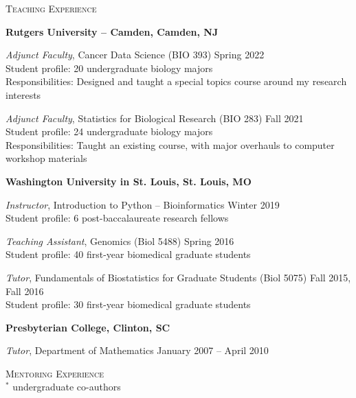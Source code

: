 \documentclass[11pt]{article}
\begin{document}
\hrulefill

\bigskip

\textsc{{\Large Teaching Experience}}

\bigskip

\textbf{Rutgers University -- Camden, Camden, NJ}

\bigskip

\emph{Adjunct Faculty}, Cancer Data Science (BIO 393) \hfill Spring 2022 \\
Student profile: 20 undergraduate biology majors \\
Responsibilities: Designed and taught a special topics course around my research interests

\bigskip

\emph{Adjunct Faculty}, Statistics for Biological Research (BIO 283) \hfill Fall 2021 \\
Student profile: 24 undergraduate biology majors \\
Responsibilities: Taught an existing course, with major overhauls to computer workshop materials

\bigskip

\textbf{Washington University in St. Louis, St. Louis, MO}

\bigskip

\emph{Instructor}, Introduction to Python -- Bioinformatics \hfill Winter 2019 \\
Student profile: 6 post-baccalaureate research fellows

\bigskip

\emph{Teaching Assistant}, Genomics (Biol 5488) \hfill Spring 2016 \\
Student profile: 40 first-year biomedical graduate students

\bigskip

\emph{Tutor}, Fundamentals of Biostatistics for Graduate Students (Biol 5075) \hfill Fall 2015, Fall 2016 \\
Student profile: 30 first-year biomedical graduate students

\bigskip

\textbf{Presbyterian College, Clinton, SC}

\bigskip

\emph{Tutor}, Department of Mathematics \hfill January 2007 -- April 2010 \\

\hrulefill

\bigskip

\textsc{\Large Mentoring Experience}\\ $^*$ undergraduate co-authors
\end{document}
